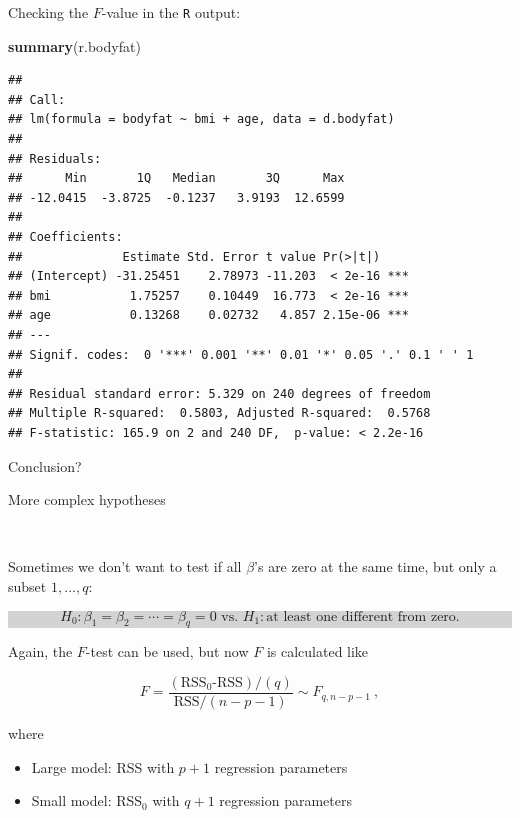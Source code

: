\documentclass[10pt,ignorenonframetext,]{beamer}
\newenvironment{Shaded}{\begin{snugshade}}{\end{snugshade}}
\newcommand{\KeywordTok}[1]{\textcolor[rgb]{0.13,0.29,0.53}{\textbf{#1}}}
\newcommand{\NormalTok}[1]{#1}
\providecommand{\tightlist}{%
  \setlength{\itemsep}{0pt}\setlength{\parskip}{0pt}}
\begin{document}
\begin{frame}[fragile]

Checking the \(F\)-value in the \texttt{R} output:

\scriptsize

\begin{Shaded}
\begin{Highlighting}[]
\KeywordTok{summary}\NormalTok{(r.bodyfat)}
\end{Highlighting}
\end{Shaded}

\begin{verbatim}
## 
## Call:
## lm(formula = bodyfat ~ bmi + age, data = d.bodyfat)
## 
## Residuals:
##      Min       1Q   Median       3Q      Max 
## -12.0415  -3.8725  -0.1237   3.9193  12.6599 
## 
## Coefficients:
##              Estimate Std. Error t value Pr(>|t|)    
## (Intercept) -31.25451    2.78973 -11.203  < 2e-16 ***
## bmi           1.75257    0.10449  16.773  < 2e-16 ***
## age           0.13268    0.02732   4.857 2.15e-06 ***
## ---
## Signif. codes:  0 '***' 0.001 '**' 0.01 '*' 0.05 '.' 0.1 ' ' 1
## 
## Residual standard error: 5.329 on 240 degrees of freedom
## Multiple R-squared:  0.5803, Adjusted R-squared:  0.5768 
## F-statistic: 165.9 on 2 and 240 DF,  p-value: < 2.2e-16
\end{verbatim}

Conclusion?

\end{frame}

\begin{frame}

\begin{block}{More complex hypotheses}

\(~\)

Sometimes we don't want to test if all \(\beta\)'s are zero at the same
time, but only a subset \(1,\ldots , q\):

\begin{center}
\colorbox{lightgray}{\begin{minipage}{11cm}
\vspace{-2mm}
$$ H_0: \beta_1=\beta_2=\cdots= \beta_q =0 \text{  vs.  } H_1: \text{at least one different from zero}.$$
\end{minipage}}
\end{center}

Again, the \(F\)-test can be used, but now \(F\) is calculated like

\[F=\frac{(\text{RSS$_0$-RSS})/(q)}{\text{RSS}/(n-p-1)} \sim F_{q,n-p-1} \ ,\]

where

\begin{itemize}
\tightlist
\item
  Large model: RSS with \(p+1\) regression parameters
\item
  Small model: RSS\(_0\) with \(q+1\) regression parameters
\end{itemize}

\end{block}

\end{frame}
\end{document}
